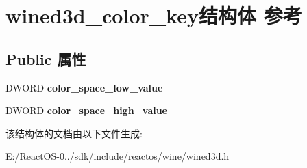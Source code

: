 \hypertarget{structwined3d__color__key}{}\section{wined3d\+\_\+color\+\_\+key结构体 参考}
\label{structwined3d__color__key}
\subsection*{Public 属性}
\begin{DoxyCompactItemize}
\item 
\mbox{\label{structwined3d__color__key_aa8fd7da10c0dd22a085c77ab855e67d2}} 
D\+W\+O\+RD {\bfseries color\+\_\+space\+\_\+low\+\_\+value}
\item 
\mbox{\label{structwined3d__color__key_a3b78bb899aed30e6e68fc460da1bee1b}} 
D\+W\+O\+RD {\bfseries color\+\_\+space\+\_\+high\+\_\+value}
\end{DoxyCompactItemize}


该结构体的文档由以下文件生成\+:\begin{DoxyCompactItemize}
\item 
E\+:/\+React\+O\+S-\/0../sdk/include/reactos/wine/wined3d.\+h\end{DoxyCompactItemize}
